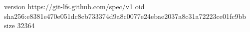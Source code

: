 version https://git-lfs.github.com/spec/v1
oid sha256:e8381e470e051dc8cb733374d9a8c0077e24ebae2037a8c31a72223ce01fc9bb
size 32364
